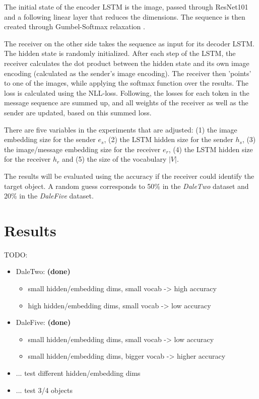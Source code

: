 \documentclass[11pt]{article}
\begin{document}
The initial state of the encoder LSTM is the image, passed through ResNet101 and a following linear layer that reduces the dimensions. The sequence is then created through Gumbel-Softmax relaxation \citep{Jang2016}.

The receiver on the other side takes the sequence as input for its decoder LSTM. The hidden state is randomly initialized. After each step of the LSTM, the receiver calculates the dot product between the hidden state and its own image encoding (calculated as the sender's image encoding). The receiver then 'points' to one of the images, while applying the softmax function over the results. The loss is calculated using the NLL-loss. Following, the losses for each token in the message sequence are summed up, and all weights of the receiver as well as the sender are updated, based on this summed loss.

There are five variables in the experiments that are adjusted: (1) the image embedding size for the sender $e_s$, (2) the LSTM hidden size for the sender $h_s$, (3) the image/message embedding size for the receiver $e_r$, (4) the LSTM hidden size for the receiver $h_r$ and (5) the size of the vocabulary $|V|$.

The results will be evaluated using the accuracy if the receiver could identify the target object. A random guess corresponds to 50\% in the \emph{DaleTwo} dataset and 20\% in the \emph{DaleFive} dataset.

\section{Results}
TODO:
\begin{itemize}
  \item DaleTwo: \textbf{(done)}
        \begin{itemize}
          \item small hidden/embedding dims, small vocab -> high accuracy
          \item high hidden/embedding dims, small vocab -> low accuracy
        \end{itemize}
  \item DaleFive: \textbf{(done)}
        \begin{itemize}
          \item small hidden/embedding dims, small vocab -> low accuracy
          \item small hidden/embedding dims, bigger vocab -> higher accuracy
        \end{itemize}
  \item ... test different hidden/embedding dims
  \item ... test 3/4 objects
\end{itemize}
\end{document}
